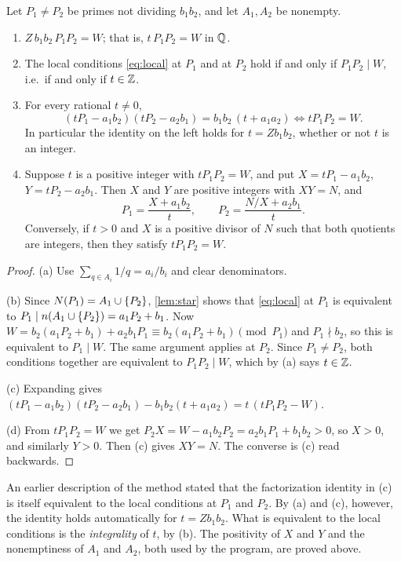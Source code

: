 \documentclass[11pt]{article}
\begin{document}
\begin{proposition}\label{prop:component}
Let $P_1\ne P_2$ be primes not dividing $b_1b_2$, and let $A_1,A_2$ be nonempty.
\begin{enumerate}[label=\textup{(\alph*)}]
\item $Z\,b_1b_2\,P_1P_2=W$; that is, $t\,P_1P_2=W$ in $\mathbb{Q}$.
\item The local conditions \eqref{eq:local} at $P_1$ and at $P_2$ hold if and only if $P_1P_2\mid W$, i.e.\ if and only if $t\in\mathbb{Z}$.
\item For every rational $t\ne0$,
\[
(tP_1-a_1b_2)(tP_2-a_2b_1)=b_1b_2\,(t+a_1a_2)\iff tP_1P_2=W .
\]
In particular the identity on the left holds for $t=Zb_1b_2$, whether or not $t$ is an integer.
\item Suppose $t$ is a positive integer with $tP_1P_2=W$, and put $X=tP_1-a_1b_2$, $Y=tP_2-a_2b_1$. Then $X$ and $Y$ are positive integers with $XY=N$, and
\[
P_1=\frac{X+a_1b_2}{t},\qquad P_2=\frac{N/X+a_2b_1}{t}.
\]
Conversely, if $t>0$ and $X$ is a positive divisor of $N$ such that both quotients are integers, then they satisfy $tP_1P_2=W$.
\end{enumerate}
\end{proposition}

\begin{proof}
(a) Use $\sum_{q\in A_i}1/q=a_i/b_i$ and clear denominators.

(b) Since $N(P_1)=A_1\cup\{P_2\}$, \cref{lem:star} shows that \eqref{eq:local} at $P_1$ is equivalent to $P_1\mid n(A_1\cup\{P_2\})=a_1P_2+b_1$.
Now $W=b_2(a_1P_2+b_1)+a_2b_1P_1\equiv b_2(a_1P_2+b_1)\pmod{P_1}$ and $P_1\nmid b_2$, so this is equivalent to $P_1\mid W$. The same argument applies at $P_2$.
Since $P_1\ne P_2$, both conditions together are equivalent to $P_1P_2\mid W$, which by (a) says $t\in\mathbb{Z}$.

(c) Expanding gives
$(tP_1-a_1b_2)(tP_2-a_2b_1)-b_1b_2(t+a_1a_2)=t\,(tP_1P_2-W)$.

(d) From $tP_1P_2=W$ we get $P_2X=W-a_1b_2P_2=a_2b_1P_1+b_1b_2>0$, so $X>0$, and similarly $Y>0$. Then (c) gives $XY=N$. The converse is (c) read backwards.
\end{proof}

\begin{remark}[Correction]\label{rem:component}
An earlier description of the method stated that the factorization identity in (c) is itself equivalent to the local conditions at $P_1$ and $P_2$. By (a) and (c), however, the identity holds automatically for $t=Zb_1b_2$. What is equivalent to the local conditions is the \emph{integrality} of $t$, by (b). The positivity of $X$ and $Y$ and the nonemptiness of $A_1$ and $A_2$, both used by the program, are proved above.
\end{remark}
\end{document}
